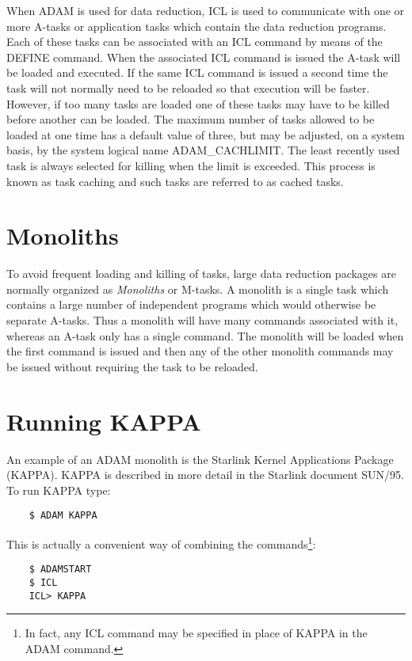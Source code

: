 \documentclass[twoside,11pt]{report}
\newcommand{\xlabel}[1]{}
\begin{document}
When ADAM is used for data reduction, ICL is used to communicate with one
or more A-tasks or application tasks which contain the data reduction programs.
Each of these tasks can be associated with an ICL command by means of the
DEFINE command. When the associated ICL command is issued the A-task will
be loaded and executed. If the same ICL command is issued a second time
the task will not normally need to be reloaded so that execution will be
faster. However, if too many tasks are loaded one of these tasks may have
to be killed before another can be loaded. The maximum number of tasks
allowed to be loaded at one time has a default value of three, but may
be adjusted, on a system basis, by the system logical name ADAM\_CACHLIMIT.
The least recently used task is always selected
for killing when the limit is exceeded. This process is known as task caching
and such tasks are referred to as cached tasks.

\section{\xlabel{monoliths}Monoliths}

To avoid frequent loading and killing of tasks, large data reduction packages
are normally organized as {\em Monoliths} or M-tasks. A monolith is a single
task which contains a large number of independent programs which would
otherwise be separate A-tasks. Thus a monolith will have many commands
associated with it, whereas an A-task only has a single command. The
monolith will be loaded when the first command is issued and then any
of the other monolith commands may be issued without requiring the task
to be reloaded.

\section{\xlabel{running_kappa}Running KAPPA}

An example of an ADAM monolith is the Starlink Kernel Applications Package
(KAPPA). KAPPA is described in more detail in the Starlink document SUN/95.
To run KAPPA type:

\begin{verbatim}
    $ ADAM KAPPA
\end{verbatim}

This is actually a convenient way of combining the commands\footnote{
In fact, any ICL command may be specified in place of KAPPA in the ADAM
command.}:

\begin{verbatim}
    $ ADAMSTART
    $ ICL
    ICL> KAPPA
\end{verbatim}
\end{document}

